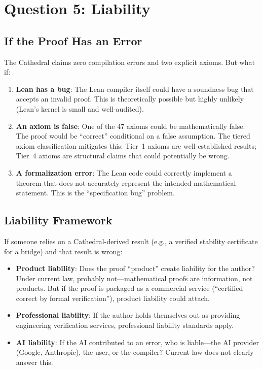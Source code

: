 \documentclass[11pt,a4paper]{article}
\begin{document}
\section{Question 5: Liability}
\label{sec:liability}

\subsection{If the Proof Has an Error}

The Cathedral claims zero compilation errors and two explicit
axioms. But what if:

\begin{enumerate}
  \item \textbf{Lean has a bug}: The Lean compiler itself could
    have a soundness bug that accepts an invalid proof. This is
    theoretically possible but highly unlikely (Lean's kernel is
    small and well-audited).

  \item \textbf{An axiom is false}: One of the 47 axioms could be
    mathematically false. The proof would be ``correct'' conditional
    on a false assumption. The tiered axiom classification mitigates
    this: Tier~1 axioms are well-established results; Tier~4 axioms
    are structural claims that could potentially be wrong.

  \item \textbf{A formalization error}: The Lean code could
    correctly implement a theorem that does not accurately represent
    the intended mathematical statement. This is the ``specification
    bug'' problem.
\end{enumerate}

\subsection{Liability Framework}

If someone relies on a Cathedral-derived result (e.g., a verified
stability certificate for a bridge) and that result is wrong:

\begin{itemize}
  \item \textbf{Product liability}: Does the proof ``product''
    create liability for the author? Under current law, probably
    not---mathematical proofs are information, not products. But
    if the proof is packaged as a commercial service (``certified
    correct by formal verification''), product liability could
    attach.

  \item \textbf{Professional liability}: If the author holds
    themselves out as providing engineering verification services,
    professional liability standards apply.

  \item \textbf{AI liability}: If the AI contributed to an error,
    who is liable---the AI provider (Google, Anthropic), the user,
    or the compiler? Current law does not clearly answer this.
\end{itemize}
\end{document}
